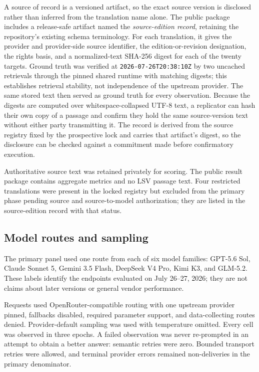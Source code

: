 \documentclass[11pt]{article}
\begin{document}
A source of record is a versioned artifact, so the exact source version is
disclosed rather than inferred from the translation name alone. The public
package includes a release-safe artifact named the \emph{source-edition
record}, retaining the repository's existing schema terminology. For each
translation, it gives the provider and provider-side source identifier, the
edition-or-revision designation, the rights basis, and
a normalized-text SHA-256 digest for each of the twenty targets. Ground truth
was verified at \texttt{2026-07-26T20:38:10Z} by two uncached retrievals
through the pinned shared runtime with matching digests; this establishes
retrieval stability, not independence of the upstream provider. The same stored
text then served as ground truth for every observation. Because the digests are
computed over whitespace-collapsed UTF-8 text, a replicator can hash their own
copy of a passage and confirm they hold the same source-version text without either
party transmitting it. The record is derived from the source registry fixed by
the prospective lock and carries that artifact's digest, so the disclosure can
be checked against a commitment made before confirmatory execution.

Authoritative source text was retained privately for scoring. The public result
package contains aggregate metrics and no LSV passage text. Four restricted
translations were present in the locked registry but excluded from the primary
phase pending source and source-to-model authorization; they are listed in the
source-edition record with that status.

\subsection{Model routes and sampling}

The primary panel used one route from each of six model families:
GPT-5.6 Sol, Claude Sonnet 5, Gemini 3.5 Flash, DeepSeek V4 Pro, Kimi K3, and
GLM-5.2. These labels identify the endpoints evaluated on July 26--27, 2026;
they are not claims about later versions or general vendor performance.

Requests used OpenRouter-compatible routing with one upstream provider pinned,
fallbacks disabled, required parameter support, and data-collecting routes
denied. Provider-default sampling was used with temperature omitted. Every
cell was observed in three epochs. A failed observation was never re-prompted
in an attempt to obtain a better answer: semantic retries were zero. Bounded
transport retries were allowed, and terminal provider errors remained
non-deliveries in the primary denominator.
\end{document}
